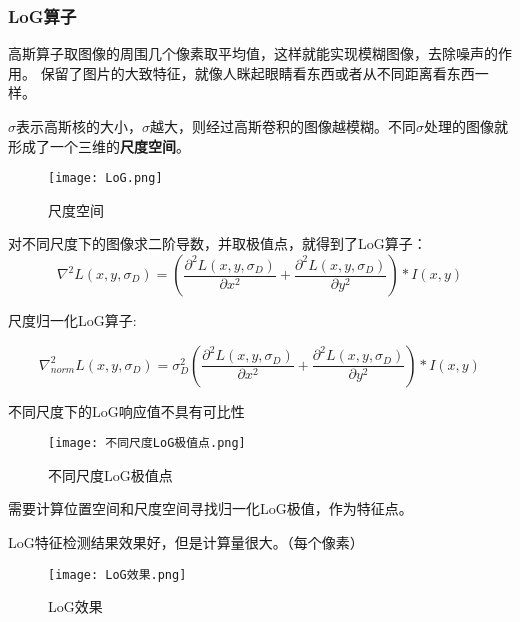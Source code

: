 \subsubsection{LoG算子}
高斯算子取图像的周围几个像素取平均值，这样就能实现模糊图像，去除噪声的作用。
保留了图片的大致特征，就像人眯起眼睛看东西或者从不同距离看东西一样。

$\sigma$表示高斯核的大小，$\sigma$越大，则经过高斯卷积的图像越模糊。不同$\sigma$处理的图像就形成了一个三维的\textbf{尺度空间}。

\begin{figure}[h]
    \centering
    \texttt{[image: LoG.png]}
    \caption{尺度空间}
    \label{fig:harrisShape}
\end{figure}

对不同尺度下的图像求二阶导数，并取极值点，就得到了LoG算子：
\begin{equation*}
    \nabla^2L(x, y, \sigma_D)=(\frac{\partial^2L(x,y,\sigma_D)}{\partial x^2} + \frac{\partial^2L(x,y,\sigma_D)}{\partial y^2})*I(x,y)
\end{equation*}

尺度归一化LoG算子:

\begin{equation*}
    \nabla_{norm}^{2}L(x, y, \sigma_D)=\sigma_{D}^{2}(\frac{\partial^2L(x,y,\sigma_D)}{\partial x^2} + \frac{\partial^2L(x,y,\sigma_D)}{\partial y^2})*I(x,y)
\end{equation*}

不同尺度下的LoG响应值不具有可比性

\begin{figure}[h]
    \centering
    \texttt{[image: 不同尺度LoG极值点.png]}
    \caption{不同尺度LoG极值点}
    \label{fig:harrisShape}
\end{figure}

需要计算位置空间和尺度空间寻找归一化LoG极值，作为特征点。

LoG特征检测结果效果好，但是计算量很大。（每个像素）
\begin{figure}[h]
    \centering
    \texttt{[image: LoG效果.png]}
    \caption{LoG效果}
    \label{fig:harrisShape}
\end{figure}